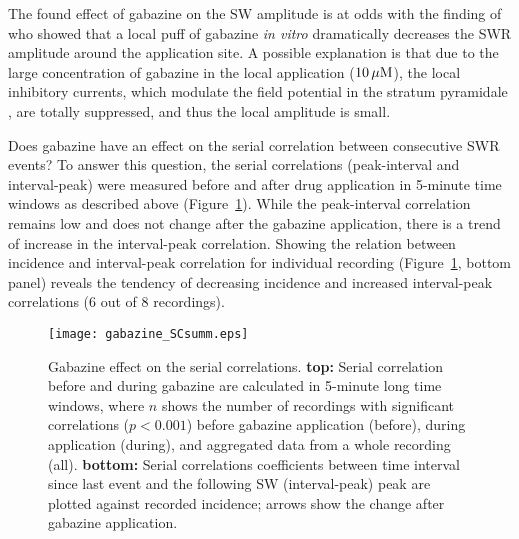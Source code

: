     The found effect of gabazine on the SW amplitude is at odds with the
    finding of \cite{Schlingloff2014} who showed that a local puff of gabazine
    \textit{in vitro} dramatically decreases the SWR amplitude around the
    application site. A possible explanation is that due to the large
    concentration of gabazine in the local application ($10\,\rm \mu M$), the
    local inhibitory currents, which modulate the field potential in the
    stratum pyramidale \citep{Schonberger2014}, are totally suppressed, and
    thus the local amplitude is small.
    
    Does gabazine have an effect on the serial correlation between consecutive
    SWR events? To answer this question, the serial correlations (peak-interval
    and interval-peak) were measured before and after drug application in
    5-minute time windows as described above
    (Figure~\ref{fig:gabazine_SCsumm}). While the peak-interval correlation
    remains low and does not change after the gabazine application, there is a
    trend of increase in the interval-peak correlation. Showing the relation
    between incidence and interval-peak correlation for individual recording
    (Figure~\ref{fig:gabazine_SCsumm}, bottom panel) reveals the tendency of
    decreasing incidence and increased interval-peak correlations (6 out of 8
    recordings).

    \begin{figure}
      \center
      \texttt{[image: gabazine\_SCsumm.eps]}
      \caption{
        Gabazine effect on the serial correlations. \textbf{top:} Serial
        correlation before and during gabazine are calculated in 5-minute long
        time windows, where $n$ shows the number of recordings with significant
        correlations ($p<0.001$) before gabazine application (before), during
        application (during), and aggregated data from a whole recording (all).
        \textbf{bottom:} Serial correlations coefficients between time interval
        since last event and the following SW (interval-peak) peak are plotted
        against recorded incidence; arrows show the change after gabazine
        application.
             }
    \label{fig:gabazine_SCsumm}
    \end{figure}

